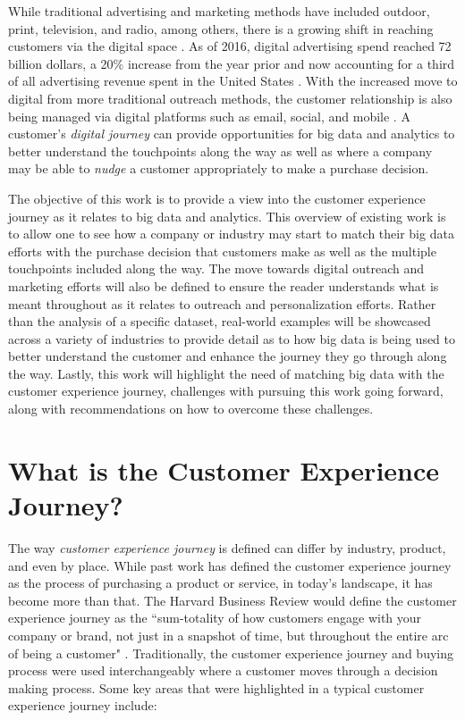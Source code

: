 \documentclass[sigconf]{acmart}
\begin{document}
While traditional advertising and marketing methods have included outdoor, print, television, and radio, among others, there is a growing shift in reaching customers via the digital space \cite{Kannan2017}. As of 2016, digital advertising spend reached 72 billion dollars, a 20\% increase from the year prior and now accounting for a third of all advertising revenue spent in the United States \cite{Center2017}. With the increased move to digital from more traditional outreach methods, the customer relationship is also being managed via digital platforms such as email, social, and mobile \cite{Kannan2017}. A customer's \textit{digital journey} can provide opportunities for big data and analytics to better understand the touchpoints along the way as well as where a company may be able to \textit{nudge} a customer appropriately to make a purchase decision. 

The objective of this work is to provide a view into the customer experience journey as it relates to big data and analytics. This overview of existing work is to allow one to see how a company or industry may start to match their big data efforts with the purchase decision that customers make as well as the multiple touchpoints included along the way. The move towards digital outreach and marketing efforts will also be defined to ensure the reader understands what is meant throughout as it relates to outreach and personalization efforts. Rather than the analysis of a specific dataset, real-world examples will be showcased across a variety of industries to provide detail as to how big data is being used to better understand the customer and enhance the journey they go through along the way. Lastly, this work will highlight the need of matching big data with the customer experience journey, challenges with pursuing this work going forward, along with recommendations on how to overcome these challenges. 

\section{What is the Customer Experience Journey?}
The way \textit{customer experience journey} is defined can differ by industry, product, and even by place. While past work has defined the customer experience journey as the process of purchasing a product or service, in today's landscape, it has become more than that. The Harvard Business Review would define the customer experience journey as the ``sum-totality of how customers engage with your company or brand, not just in a snapshot of time, but throughout the entire arc of being a customer" \cite{Richardson2010}. Traditionally, the customer experience journey and buying process were used interchangeably where a customer moves through a decision making process. Some key areas that were highlighted in a typical customer experience journey include: 
\end{document}
